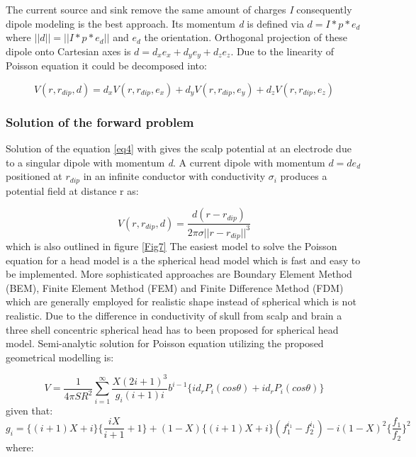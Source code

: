 The current source and sink remove the same amount of charges \textit{I} consequently dipole modeling is the best approach. Its momentum \textit{d} is defined via $d=I*p*e_{d}$ where $||d||=||I*p*e_{d}||$ and $e_{d}$ the orientation. Orthogonal projection of these dipole onto Cartesian axes is $d=d_{x}e_{x}+d_{y}e_{y}+d_{z}e_{z}$. Due to the linearity of Poisson equation it could be decomposed into:

\begin{equation}
    V(r,r_{dip},d)=d_{x}V(r,r_{dip},e_{x})+d_{y}V(r,r_{dip},e_{y})+d_{z}V(r,r_{dip},e_{z})
\end{equation}


\subsubsection{Solution of the forward problem}

Solution of the equation \ref{eq4} with gives the scalp potential at an electrode due to a singular dipole with momentum \textit{d}. A current dipole with momentum $d=de_{d}$ positioned at $r_{dip}$ in an infinite conductor with conductivity $\sigma_{i}$ produces a potential field at distance r as:

\begin{equation}
    V(r,r_{dip},d)=\frac{d(r-r_{dip})}{2\pi\sigma||r-r_{dip}||^3}
\end{equation}
which is also outlined in figure \ref{Fig7}
The easiest model to solve the Poisson equation for a head model is a the spherical head model which is fast and easy to be implemented. More sophisticated approaches are Boundary Element Method (BEM), Finite Element Method (FEM) and Finite Difference Method (FDM) which are generally employed for realistic shape instead of spherical which is not realistic. Due to the difference in conductivity of skull from scalp and brain a three shell concentric spherical head has to been proposed for spherical head model. Semi-analytic solution for Poisson equation utilizing the proposed geometrical modelling is:

\begin{equation}\label{eq11}
    V=\frac{1}{4\pi S R^2}\sum_{i=1}^{\infty}\frac{X(2i+1)^3}{g_{i}(i+1)i}b^{i-1}\{id_{r}P_{i}(cos\theta)+id_{r}P_{i}(cos\theta)\}
\end{equation}
given that:
\begin{equation}
    g_{i}=\{(i+1)X+i\}\{\frac{iX}{i+1}+1\}+(1-X)\{(i+1)X+i\}(f_{1}^{i_{1}}-f_{2}^{i_{1}})-i(1-X)^2\{\frac{f_{1}}{f_{2}}\}^2
\end{equation}
where:




